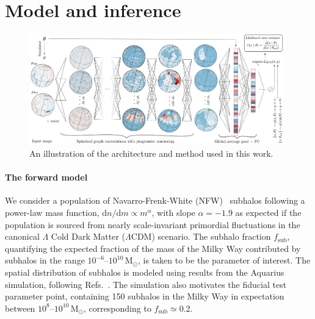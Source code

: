 \documentclass[]{article}
\begin{document}
\section{Model and inference}
\label{sec:model}

\begin{figure}[!htbp]
\centering
\includegraphics[width=0.98\textwidth]{figures/drawing.pdf}
\caption{An illustration of the architecture and method used in this work.}
\label{fig:model}
\end{figure}

\paragraph{The forward model} We consider a population of Navarro-Frenk-White (NFW)~\cite{Navarro:1995iw} subhalos following a power-law mass function, $\mathrm dn / \mathrm dm \propto m^\alpha$, with slope $\alpha = -1.9$ as expected if the population is sourced from nearly scale-invariant primordial fluctuations in the canonical $\Lambda$ Cold Dark Matter ($\Lambda$CDM) scenario. 
The subhalo fraction $f_\mathrm{sub}$, quantifying the expected fraction of the mass of the Milky Way contributed by subhalos in the range $10^{-6}$--$10^{10}\,\mathrm{M}_\odot$, is taken to be the parameter of interest. The spatial distribution of subhalos is modeled using results from the Aquarius simulation, following Refs.~\cite{Hutten:2016jko,Springel:2008cc}. The simulation also motivates the fiducial test parameter point, containing 150 subhalos in the Milky Way in expectation between $10^{8}$--$10^{10}\,\mathrm{M}_\odot$, corresponding to $f_\mathrm{sub} \simeq 0.2$.
\end{document}
